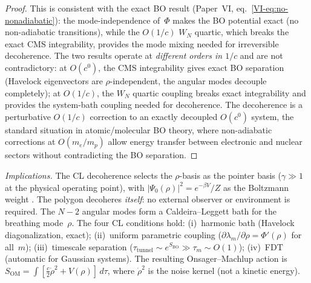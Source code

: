 \begin{proof}
This is consistent with the exact BO result
(Paper~VI, eq.~\eqref{VI-eq:no-nonadiabatic}):
the mode-independence of~$\Phi$ makes the BO
potential exact (no non-adiabatic transitions),
while the $O(1/c)$ $W_N$ quartic, which breaks the
exact CMS integrability, provides the mode mixing
needed for irreversible decoherence.
The two results operate at \emph{different orders in $1/c$}
and are not contradictory:
at $O(c^0)$, the CMS integrability gives exact BO separation
(Havelock eigenvectors are $\rho$-independent, the angular
modes decouple completely);
at $O(1/c)$, the $W_N$ quartic coupling breaks exact
integrability and provides the system-bath coupling needed
for decoherence.
The decoherence is a perturbative $O(1/c)$ correction to an
exactly decoupled $O(c^0)$ system, the standard situation in
atomic/molecular BO theory, where non-adiabatic corrections
at $O(m_e/m_p)$ allow energy transfer between electronic and
nuclear sectors without contradicting the BO separation.
\end{proof}

\noindent
\emph{Implications.}
The CL decoherence selects the $\rho$-basis as the pointer basis
($\gamma \gg 1$ at the physical operating point),
with $|\Psi_0(\rho)|^2 = e^{-\beta V}/Z$
as the Boltzmann weight \citep{Zurek2003}.
The polygon decoheres \emph{itself}: no external
observer or environment is required.
The $N{-}2$ angular modes form a Caldeira--Leggett bath for
the breathing mode~$\rho$.
The four CL conditions hold:
(i)~harmonic bath (Havelock diagonalization, exact);
(ii)~uniform parametric coupling
($\partial\lambda_m/\partial\rho = \Phi'(\rho)$ for all~$m$);
(iii)~timescale separation
($\tau_{\mathrm{tunnel}} \sim e^{S_{\mathrm{BO}}} \gg \tau_m \sim O(1)$);
(iv)~FDT (automatic for Gaussian systems).
The resulting Onsager--Machlup action is
$S_{\mathrm{OM}} = \int[\tfrac{c}{2}\dot\rho^2 + V(\rho)]\,d\tau$,
where $\dot\rho^2$ is the noise kernel (not a kinetic energy).

